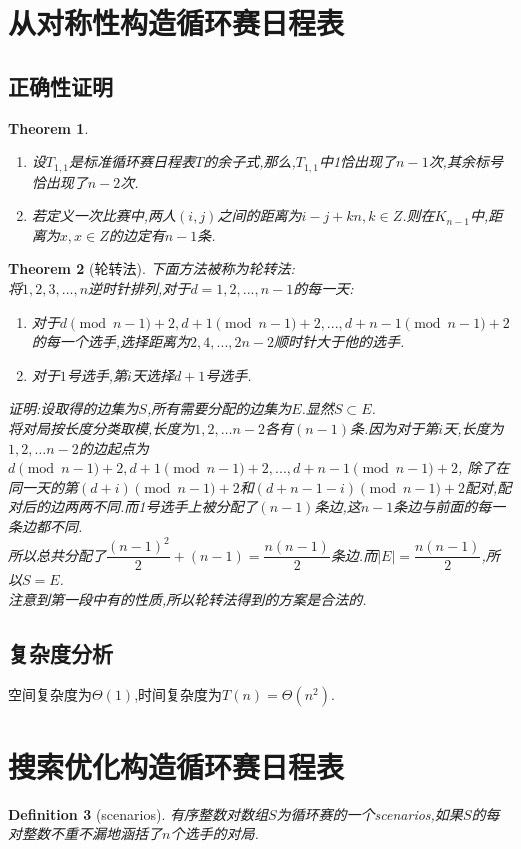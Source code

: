 \documentclass[UTF8]{ctexart}
\newtheorem{dft}{Definition}
\newtheorem{tem}[dft]{Theorem}
\begin{document}
\section{从对称性构造循环赛日程表}
\subsection{正确性证明}
\begin{tem}
    \begin{enumerate}[(1)]
    \item 设$T_{1,1}$是标准循环赛日程表$T$的余子式,那么,$T_{1,1}$中1恰出现了$n-1$次,其余标号恰出现了$n-2$次.
    \item 若定义一次比赛中,两人$(i,j)$之间的距离为$i - j + kn, k\in Z$.则在$K_{n-1}$中,距离为$x, x \in Z$的边定有$n-1$条.
    \end{enumerate}
\end{tem}
\begin{tem}[轮转法]
    下面方法被称为轮转法:\\
    将$1,2,3,\dots,n$逆时针排列,对于$d=1,2,...,n-1$的每一天:
\begin{enumerate}[$(1)$]
    \item 对于$d\pmod {n-1}+2,d+1\pmod {n-1}+2,...,d+n-1\pmod {n-1}+2$的每一个选手,选择距离为$2,4,...,2n-2$顺时针大于他的选手.
    \item 对于$1$号选手,第$i$天选择$d+1$号选手.
\end{enumerate}
证明:设取得的边集为$S$,所有需要分配的边集为$E$.显然$S\subset E$.\\
将对局按长度分类取模,长度为$1,2,\dots n - 2$各有$(n-1)$条.因为对于第$i$天,长度为$1,2,\dots n - 2$的边起点为$d\pmod {n-1}+2,d+1\pmod {n-1}+2,...,d+n-1\pmod {n-1}+2$, 除了在同一天的第$(d + i)\pmod {n-1} + 2$和$(d + n - 1 - i)\pmod {n-1} + 2$配对,配对后的边两两不同.而1号选手上被分配了$(n-1)$条边,这$n-1$条边与前面的每一条边都不同.\\
所以总共分配了$\dfrac{(n -1)^2}{2} + (n - 1) = \dfrac{n(n -1)}{2}$条边.而$|E| = \dfrac{n(n -1)}{2}$,所以$S = E$.\\
注意到第一段中有的性质,所以轮转法得到的方案是合法的.
\end{tem}
\subsection{复杂度分析}
空间复杂度为$\Theta(1)$,时间复杂度为$T(n) = \Theta(n^2)$.
\newpage
\section{搜索优化构造循环赛日程表}
\begin{dft}[scenarios]
    有序整数对数组$S$为循环赛的一个scenarios,如果$S$的每对整数不重不漏地涵括了$n$个选手的对局.
\end{dft}
\end{document}
